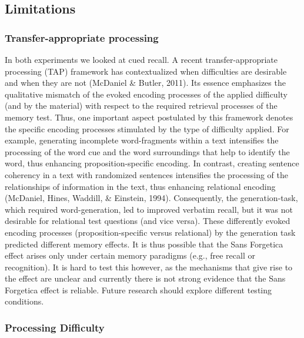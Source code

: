 \documentclass[english,pdf]{apa6}
\begin{document}
\hypertarget{limitations}{%
\subsection{Limitations}\label{limitations}}

\hypertarget{transfer-appropriate-processing}{%
\subsubsection{Transfer-appropriate processing}\label{transfer-appropriate-processing}}

In both experiments we looked at cued recall. A recent transfer-appropriate processing (TAP) framework has contextualized when difficulties are desirable and when they are not (McDaniel \& Butler, 2011). Its essence emphasizes the qualitative mismatch of the evoked encoding processes of the applied difficulty (and by the material) with respect to the required retrieval processes of the memory test. Thus, one important aspect postulated by this framework denotes the specific encoding processes stimulated by the type of difficulty applied. For example, generating incomplete word-fragments within a text intensifies the processing of the word cue and the word surroundings that help to identify the word, thus enhancing proposition-specific encoding. In contrast, creating sentence coherency in a text with randomized sentences intensifies the processing of the relationships of information in the text, thus enhancing relational encoding (McDaniel, Hines, Waddill, \& Einstein, 1994). Consequently, the generation-task, which required word-generation, led to improved verbatim recall, but it was not desirable for relational test questions (and vice versa). These differently evoked encoding processes (proposition-specific versus relational) by the generation task predicted different memory effects. It is thus possible that the Sans Forgetica effect arises only under certain memory paradigms (e.g., free recall or recognition). It is hard to test this however, as the mechanisms that give rise to the effect are unclear and currently there is not strong evidence that the Sans Forgetica effect is reliable. Future research should explore different testing conditions.

\hypertarget{processing-difficulty}{%
\subsubsection{Processing Difficulty}\label{processing-difficulty}}
\end{document}
